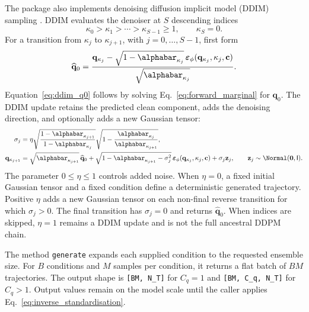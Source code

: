 The package also implements denoising diffusion implicit model (DDIM) sampling
\cite{song2021ddim}. DDIM evaluates the denoiser at $S$ descending indices
\begin{equation}
    \kappa_0>\kappa_1>\cdots>\kappa_{S-1}\geq1,
    \qquad
    \kappa_S=0 .
    \label{eq:ddim_indices}
\end{equation}
For a transition from $\kappa_j$ to $\kappa_{j+1}$, with
$j=0,\ldots,S-1$, first form
\begin{equation}
    \widehat{\mathbf{q}}_0
    =
    \frac{
        \mathbf{q}_{\kappa_j}
        -
        \sqrt{1-\alphabar_{\kappa_j}}\,
        \boldsymbol{\varepsilon}_\phi(\mathbf{q}_{\kappa_j},\kappa_j,\mathbf{c})
    }{\sqrt{\alphabar_{\kappa_j}}}.
    \label{eq:ddim_q0}
\end{equation}
Equation~\eqref{eq:ddim_q0} follows by solving
Eq.~\eqref{eq:forward_marginal} for $\mathbf{q}_0$. The DDIM update retains the
predicted clean component, adds the denoising direction, and optionally adds a
new Gaussian tensor:
\begin{align}
    \sigma_j
    &=
    \eta
    \sqrt{\frac{1-\alphabar_{\kappa_{j+1}}}{1-\alphabar_{\kappa_j}}}
    \sqrt{1-\frac{\alphabar_{\kappa_j}}{\alphabar_{\kappa_{j+1}}}},
    \label{eq:ddim_sigma}\\
    \mathbf{q}_{\kappa_{j+1}}
    &=
    \sqrt{\alphabar_{\kappa_{j+1}}}\,\widehat{\mathbf{q}}_0
    +
    \sqrt{1-\alphabar_{\kappa_{j+1}}-\sigma_j^2}\,
    \boldsymbol{\varepsilon}_\phi(\mathbf{q}_{\kappa_j},\kappa_j,\mathbf{c})
    +
    \sigma_j\mathbf{z}_j,
    \qquad
    \mathbf{z}_j\sim\Normal(\mathbf{0},\mathsf{I}).
    \label{eq:ddim_update}
\end{align}
The parameter $0\leq\eta\leq1$ controls added noise. When $\eta=0$, a fixed
initial Gaussian tensor and a fixed condition define a deterministic generated
trajectory. Positive $\eta$ adds a new Gaussian tensor on each non-final reverse
transition for which $\sigma_j>0$. The final transition has $\sigma_j=0$ and
returns $\widehat{\mathbf{q}}_0$. When indices are skipped, $\eta=1$ remains a
DDIM update and is not the full ancestral DDPM chain.

The method \texttt{generate} expands each supplied condition to the requested
ensemble size. For $B$ conditions and $M$ samples per condition, it returns a
flat batch of $BM$ trajectories. The output shape is
\texttt{[BM, N\_T]} for $C_q=1$ and \texttt{[BM, C\_q, N\_T]} for
$C_q>1$. Output values remain on the model scale until the caller applies
Eq.~\eqref{eq:inverse_standardisation}.

